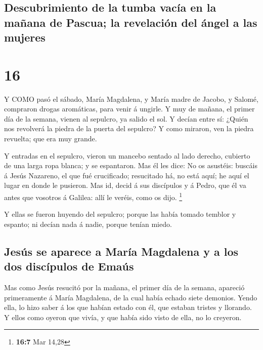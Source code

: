 \hypertarget{descubrimiento-de-la-tumba-vacuxeda-en-la-mauxf1ana-de-pascua-la-revelaciuxf3n-del-uxe1ngel-a-las-mujeres}{%
\subsection{Descubrimiento de la tumba vacía en la mañana de Pascua; la
revelación del ángel a las
mujeres}\label{descubrimiento-de-la-tumba-vacuxeda-en-la-mauxf1ana-de-pascua-la-revelaciuxf3n-del-uxe1ngel-a-las-mujeres}}

\hypertarget{section-15}{%
\section{16}\label{section-15}}

 Y COMO pasó el sábado, María Magdalena, y María madre de
Jacobo, y Salomé, compraron drogas aromáticas, para venir á ungirle.
 Y muy de mañana, el primer día de la semana, vienen al
sepulcro, ya salido el sol.  Y decían entre sí: ¿Quién nos
revolverá la piedra de la puerta del sepulcro?  Y como
miraron, ven la piedra revuelta; que era muy grande.

 Y entradas en el sepulcro, vieron un mancebo sentado al
lado derecho, cubierto de una larga ropa blanca; y se espantaron.
 Mas él les dice: No os asustéis: buscáis á Jesús Nazareno,
el que fué crucificado; resucitado há, no está aquí; he aquí el lugar en
donde le pusieron.  Mas id, decid á sus discípulos y á
Pedro, que él va antes que vosotros á Galilea: allí le veréis, como os
dijo. \footnote{\textbf{16:7} Mar 14,28}

 Y ellas se fueron huyendo del sepulcro; porque las había
tomado temblor y espanto; ni decían nada á nadie, porque tenían miedo.

\hypertarget{jesuxfas-se-aparece-a-maruxeda-magdalena-y-a-los-dos-discuxedpulos-de-emauxfas}{%
\subsection{Jesús se aparece a María Magdalena y a los dos discípulos de
Emaús}\label{jesuxfas-se-aparece-a-maruxeda-magdalena-y-a-los-dos-discuxedpulos-de-emauxfas}}

 Mas como Jesús resucitó por la mañana, el primer día de la
semana, apareció primeramente á María Magdalena, de la cual había echado
siete demonios.  Yendo ella, lo hizo saber á los que habían
estado con él, que estaban tristes y llorando.  Y ellos
como oyeron que vivía, y que había sido visto de ella, no lo creyeron.

